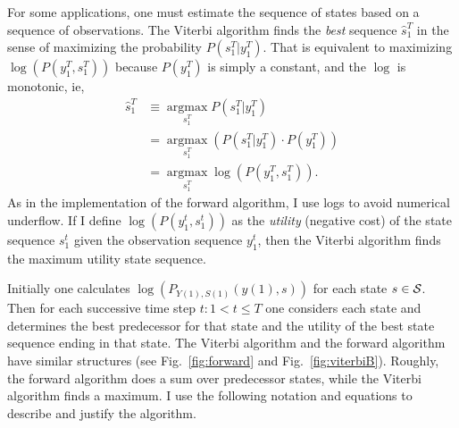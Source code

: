 \documentclass[]{article}
\newcommand{\ts}[3]{#1_{#2}^{#3}}                    %
\newcommand{\argmax}{\operatorname*{argmax}}
\newcommand{\ti}[2]{{#1}{(#2)}}                  %
\newcommand{\states}{{\cal S}}
\begin{document}
For some applications, one must estimate the sequence of states based
on a sequence of observations.  The Viterbi algorithm %
%
finds the \emph{best} sequence $\ts{\hat s}{1}{T}$ in the sense of
maximizing the probability $P\left( \ts{s}{1}{T}|\ts{y}{1}{T}
\right)$.  That is equivalent to maximizing $\log \left( P\left(
    \ts{y}{1}{T},\ts{s}{1}{T} \right) \right)$ because $P \left(
  \ts{y}{1}{T} \right)$ is simply a constant, and the $\log$ is
monotonic, ie,
\begin{align*}
  \ts{\hat s}{1}{T} &\equiv \argmax_{\ts{s}{1}{T}}
  P(\ts{s}{1}{T}|\ts{y}{1}{T})\\
  &= \argmax_{\ts{s}{1}{T}} \left( P(\ts{s}{1}{T}|\ts{y}{1}{T}) \cdot
    P(\ts{y}{1}{T}) \right)\\
  &= \argmax_{\ts{s}{1}{T}} \log \left( P(\ts{y}{1}{T},\ts{s}{1}{T})
  \right).
\end{align*}
As in the implementation of the forward algorithm, I use logs to
avoid numerical underflow.  If I define $\log \left( P\left(
    \ts{y}{1}{t}, \ts{s}{1}{t} \right) \right)$ as the
\emph{utility} (negative cost) of the state sequence $\ts{s}{1}{t}$
given the observation sequence $\ts{y}{1}{t}$, then the Viterbi
algorithm finds the maximum utility state sequence.

Initially one calculates $\log\left(P_{\ti{Y}{1},\ti{S}{1}}
  \left(\ti{y}{1}, s \right) \right)$ for each state $s \in
\states$.  Then for each successive time step $t: 1 < t \leq T$ one
considers each state and determines the best predecessor for that
state and the utility of the best state sequence ending in that state.
The Viterbi algorithm and the forward algorithm have similar
structures (see Fig.~\ref{fig:forward} and Fig.~\ref{fig:viterbiB}).
Roughly, the forward algorithm does a sum over predecessor states,
while the Viterbi algorithm finds a maximum. I use the following
notation and equations to describe and justify the algorithm.
\end{document}

